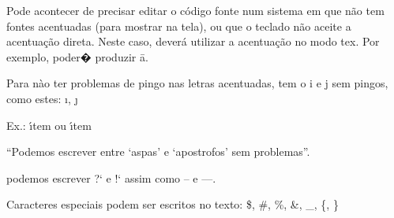 \documentclass{article}
\begin{document}
Pode acontecer de precisar editar o c\'odigo fonte num sistema em que n\~ao tem 
fontes acentuadas (para mostrar na tela), ou que o teclado n\~ao aceite a acentua\c c\~ao direta.
Neste caso, dever\'a utilizar a acentua\c c\~ao no modo tex.
Por exemplo, poder� produzir \=a.

Para n\`ao ter problemas de pingo nas letras acentuadas, tem o i e j sem pingos, como estes:
\i, \j

Ex.: \'\i tem ou \'{\i}tem



``Podemos escrever entre `aspas' e `apostrofos' sem problemas''.


podemos escrever ?` e !` assim como -- e ---.

Caracteres especiais podem ser escritos no texto:
\$, \#, \%, \&, \_, \{, \}
\end{document}
